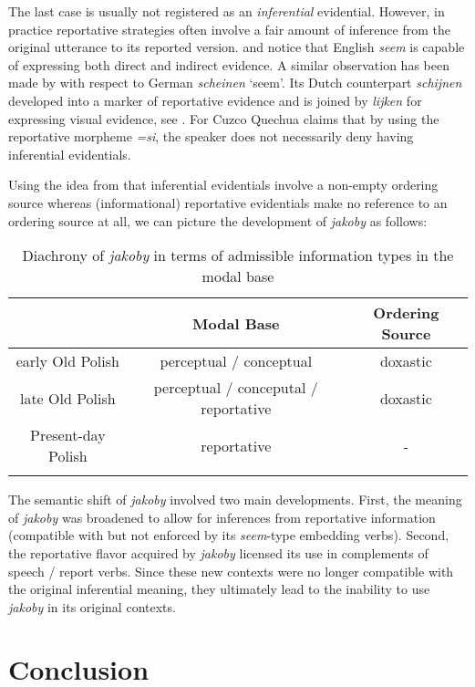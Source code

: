 \documentclass[output=paper
,modfonts
,nonflat]{langsci/langscibook}
\begin{document}
\noindent The last case is usually not registered as an \emph{inferential} evidential. However, in practice reportative strategies often involve a fair amount of inference from the original utterance to its reported version. \textcite{Haan2007} and \textcite{Grimm2010} notice that English \emph{seem} is capable of expressing both direct and indirect evidence. A similar observation has been made by \textcite{Reis2007} with respect to German \emph{scheinen} `seem'. Its Dutch counterpart \emph{schijnen} developed into a marker of reportative evidence and is joined by \emph{lijken} for expressing visual evidence, see \textcite{Koring2013}. For Cuzco Quechua \textcite[53-55]{Faller2001} claims that by using the reportative morpheme \emph{=si}, the speaker does not necessarily deny having inferential evidentials.  

Using the idea from \textcite{Faller2011} that inferential evidentials involve a non-empty ordering source whereas (informational) reportative evidentials make no reference to an ordering source at all, we can picture the development of \emph{jakoby} as follows:

\begin{table}[h] \center
\begin{tabular}{ccc} 
\lsptoprule
{} & Modal Base & Ordering Source \\
\midrule
early Old Polish & perceptual / conceptual & doxastic \\
late Old Polish & perceptual / conceputal / reportative & doxastic \\
Present-day Polish & reportative & - \\
\lspbottomrule
\end{tabular}
\caption{Diachrony of \emph{jakoby} in terms of admissible information types in the modal base}
\end{table}

\noindent The semantic shift of \emph{jakoby} involved two main developments. First, the meaning of \emph{jakoby} was broadened to allow for inferences from reportative information (compatible with but not enforced by its \emph{seem}-type embedding verbs). Second, the reportative flavor acquired by \emph{jakoby} licensed its use in complements of speech / report verbs. Since these new contexts were no longer compatible with the original inferential meaning, they ultimately lead to the inability to use \emph{jakoby} in its original contexts. 

\section{Conclusion}
\end{document}
